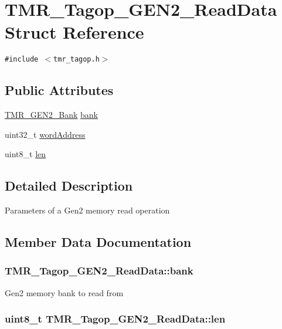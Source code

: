 \hypertarget{struct_t_m_r___tagop___g_e_n2___read_data}{
\section{TMR\_\-Tagop\_\-GEN2\_\-ReadData Struct Reference}
\label{struct_t_m_r___tagop___g_e_n2___read_data}
}
{\tt \#include $<$tmr\_\-tagop.h$>$}

\subsection*{Public Attributes}
\begin{CompactItemize}
\item 
\hyperlink{tmr__gen2_8h_0037d967117e4d1fb33a75ef09a81b03}{TMR\_\-GEN2\_\-Bank} \hyperlink{struct_t_m_r___tagop___g_e_n2___read_data_12f0bae420875bfa48ab4608dc25a7bf}{bank}
\item 
uint32\_\-t \hyperlink{struct_t_m_r___tagop___g_e_n2___read_data_3bbe4d1e5d578e7a489048221a0b1ead}{wordAddress}
\item 
uint8\_\-t \hyperlink{struct_t_m_r___tagop___g_e_n2___read_data_33232be7903112ac7163ca06b9c2e797}{len}
\end{CompactItemize}


\subsection{Detailed Description}
Parameters of a Gen2 memory read operation 

\subsection{Member Data Documentation}
\hypertarget{struct_t_m_r___tagop___g_e_n2___read_data_12f0bae420875bfa48ab4608dc25a7bf}{
\subsubsection[{bank}]{ {\bf TMR\_\-Tagop\_\-GEN2\_\-ReadData::bank}}}
\label{struct_t_m_r___tagop___g_e_n2___read_data_12f0bae420875bfa48ab4608dc25a7bf}


Gen2 memory bank to read from \hypertarget{struct_t_m_r___tagop___g_e_n2___read_data_33232be7903112ac7163ca06b9c2e797}{
\subsubsection[{len}]{\setlength{\rightskip}{0pt plus 5cm}uint8\_\-t {\bf TMR\_\-Tagop\_\-GEN2\_\-ReadData::len}}}
\label{struct_t_m_r___tagop___g_e_n2___read_data_33232be7903112ac7163ca06b9c2e797}


